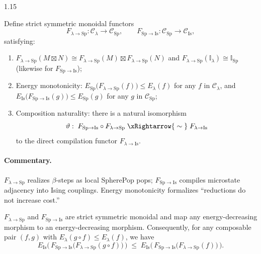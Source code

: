 \documentclass[12pt,a4paper]{article}
\begin{document}
\begin{spacing}{1.15}
\begin{definition}
Define strict symmetric monoidal functors
\[
F_{\lambda\to\mathrm{Sp}} \colon \mathcal{C}_{\lambda}\to\mathcal{C}_{\mathrm{Sp}},
\qquad
F_{\mathrm{Sp}\to\mathrm{Is}} \colon \mathcal{C}_{\mathrm{Sp}}\to\mathcal{C}_{\mathrm{Is}},
\]
satisfying:
\begin{enumerate}[label=(\alph*),leftmargin=1.2em]
\item $F_{\lambda\to\mathrm{Sp}}(M\boxtimes N) \cong F_{\lambda\to\mathrm{Sp}}(M)\boxtimes F_{\lambda\to\mathrm{Sp}}(N)$ and $F_{\lambda\to\mathrm{Sp}}(\mathbb{I}_{\lambda})\cong \mathbb{I}_{\mathrm{Sp}}$ (likewise for $F_{\mathrm{Sp}\to\mathrm{Is}}$);
\item Energy monotonicity: $E_{\mathrm{Sp}}\!\big(F_{\lambda\to\mathrm{Sp}}(f)\big)\le E_{\lambda}(f)$ for any $f$ in $\mathcal{C}_{\lambda}$, and $E_{\mathrm{Is}}\!\big(F_{\mathrm{Sp}\to\mathrm{Is}}(g)\big)\le E_{\mathrm{Sp}}(g)$ for any $g$ in $\mathcal{C}_{\mathrm{Sp}}$;
\item Composition naturality: there is a natural isomorphism
\[
\vartheta:\;F_{\mathrm{Sp}\to\mathrm{Is}}\circ F_{\lambda\to\mathrm{Sp}} \;\xRightarrow{\;\sim\;}\; F_{\lambda\to\mathrm{Is}}
\]
to the direct compilation functor $F_{\lambda\to\mathrm{Is}}$.
\end{enumerate}
\end{definition}

\paragraph{Commentary.}
$F_{\lambda\to\mathrm{Sp}}$ realizes $\beta$-steps as local SpherePop pops; $F_{\mathrm{Sp}\to\mathrm{Is}}$ compiles microstate adjacency into Ising couplings. Energy monotonicity formalizes “reductions do not increase cost.”

\begin{theorem}
\label{thm:monoidal-lyapunov}
$F_{\lambda\to\mathrm{Sp}}$ and $F_{\mathrm{Sp}\to\mathrm{Is}}$ are strict symmetric monoidal and map any energy-decreasing morphism to an energy-decreasing morphism. Consequently, for any composable pair $(f,g)$ with $E_{\lambda}(g\circ f)\le E_{\lambda}(f)$, we have
\[
E_{\mathrm{Is}}\Big(\,F_{\mathrm{Sp}\to\mathrm{Is}}\big(F_{\lambda\to\mathrm{Sp}}(g\circ f)\big)\,\Big)
\;\le\;
E_{\mathrm{Is}}\Big(\,F_{\mathrm{Sp}\to\mathrm{Is}}\big(F_{\lambda\to\mathrm{Sp}}(f)\big)\,\Big).
\]
\end{theorem}


\end{spacing}
\end{document}
